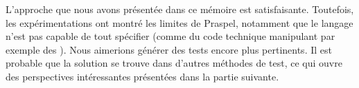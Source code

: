 L'approche que nous avons présentée dans ce mémoire est satisfaisante.
Toutefois, les expérimentations ont montré les limites de Praspel, notamment que
le langage n'est pas capable de tout spécifier (comme du code technique
manipulant par exemple des ). Nous aimerions générer des
tests encore plus pertinents. Il est probable que la solution se trouve dans
d'autres méthodes de test, ce qui ouvre des perspectives intéressantes
présentées dans la partie suivante.
